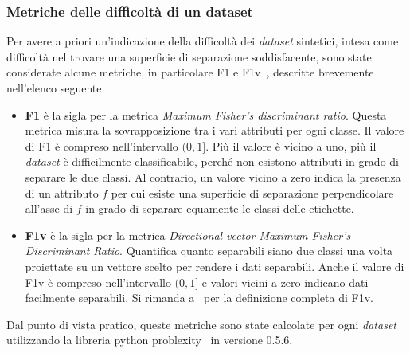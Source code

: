 \subsubsection{Metriche delle difficoltà di un dataset}\label{sec:metriche_dataset}
Per avere a priori un'indicazione della difficoltà dei \emph{dataset} sintetici, intesa come difficoltà nel trovare una superficie di separazione soddisfacente, sono state considerate alcune metriche, in particolare F1 e F1v~\cite{ds_complexity}, descritte brevemente nell'elenco seguente.
\begin{itemize}
    \item \textbf{F1} è la sigla per la metrica \emph{Maximum Fisher’s discriminant ratio}. Questa metrica misura la sovrapposizione tra i vari attributi per ogni classe.
    Il valore di F1 è compreso nell'intervallo $(0,1]$. Più il valore è vicino a uno, più il \emph{dataset} è difficilmente classificabile, perché non esistono attributi in grado di separare le due classi. Al contrario, un valore vicino a zero indica la presenza di un attributo $f$ per cui esiste una superficie di separazione perpendicolare all'asse di $f$ in grado di separare equamente le classi delle etichette.
    \item \textbf{F1v} è la sigla per la metrica \emph{Directional-vector Maximum Fisher’s Discriminant Ratio}. Quantifica quanto separabili siano due classi una volta proiettate su un vettore scelto per rendere i dati separabili.
    Anche il valore di F1v è compreso nell'intervallo $(0,1]$ e valori vicini a zero indicano dati facilmente separabili.    
    Si rimanda a~\cite{ds_complexity} per la definizione completa di F1v.
\end{itemize}

Dal punto di vista pratico, queste metriche sono state calcolate per ogni \emph{dataset} utilizzando la libreria python problexity~\cite{problexity} in versione 0.5.6.


